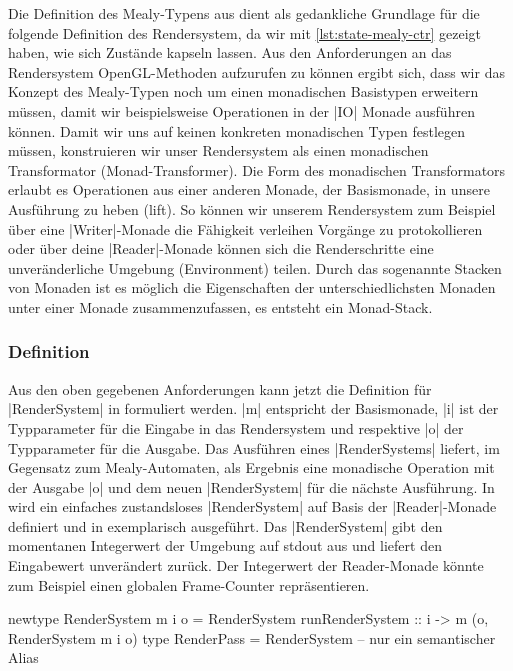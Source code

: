 Die Definition des Mealy-Typens aus  dient als gedankliche Grundlage für die folgende Definition des Rendersystem, da wir mit \ref{lst:state-mealy-ctr} gezeigt haben, wie sich Zustände kapseln lassen. Aus den Anforderungen an das Rendersystem OpenGL-Methoden aufzurufen zu können ergibt sich, dass wir das Konzept des Mealy-Typen noch um einen monadischen Basistypen erweitern müssen, damit wir beispielsweise Operationen in der |IO| Monade ausführen können. Damit wir uns auf keinen konkreten monadischen Typen festlegen müssen, konstruieren wir unser Rendersystem als einen monadischen Transformator (Monad-Transformer). Die Form des monadischen Transformators erlaubt es Operationen aus einer anderen Monade, der Basismonade, in unsere Ausführung zu heben (lift). So können wir unserem Rendersystem zum Beispiel über eine |Writer|-Monade die Fähigkeit verleihen Vorgänge zu protokollieren oder über deine |Reader|-Monade können sich die Renderschritte eine unveränderliche Umgebung (Environment) teilen. Durch das sogenannte Stacken von Monaden ist es möglich die Eigenschaften der unterschiedlichsten Monaden unter einer Monade zusammenzufassen, es entsteht ein Monad-Stack.

\subsubsection{Definition}

Aus den oben gegebenen Anforderungen kann jetzt die Definition für |RenderSystem| in  formuliert werden. |m| entspricht der Basismonade, |i| ist der Typparameter für die Eingabe in das Rendersystem und respektive |o| der Typparameter für die Ausgabe. Das Ausführen eines |RenderSystems| liefert, im Gegensatz zum Mealy-Automaten, als Ergebnis eine monadische Operation mit der Ausgabe |o| und dem neuen |RenderSystem| für die nächste Ausführung. In  wird ein einfaches zustandsloses |RenderSystem| auf Basis der |Reader|-Monade definiert und in  exemplarisch ausgeführt. Das |RenderSystem| gibt den momentanen Integerwert der Umgebung auf stdout aus und liefert den Eingabewert unverändert zurück. Der Integerwert der Reader-Monade könnte zum Beispiel einen globalen Frame-Counter repräsentieren.

\begin{haskell}[label={lst:definition-rendersystem},caption={Definition Rendersystem}]
newtype RenderSystem m i o = RenderSystem { runRenderSystem :: i -> m (o, RenderSystem m i o) }
type RenderPass = RenderSystem -- nur ein semantischer Alias
\end{haskell}


